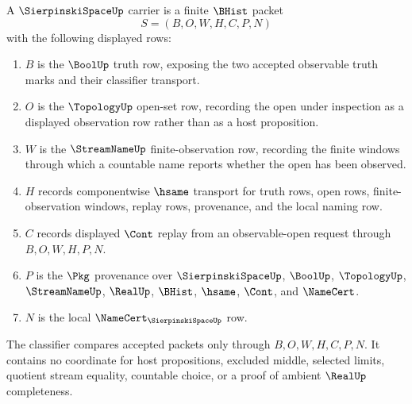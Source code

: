 \begin{definition}
\label{def:sierpinski-space-carrier}
A $\SierpinskiSpaceUp$ carrier is a finite $\BHist$ packet
$$
S=(B,O,W,H,C,P,N)
$$
with the following displayed rows:
\begin{enumerate}
\item $B$ is the $\BoolUp$ truth row, exposing the two accepted observable truth marks and their classifier transport.
\item $O$ is the $\TopologyUp$ open-set row, recording the open under inspection as a displayed observation row rather than as a host proposition.
\item $W$ is the $\StreamNameUp$ finite-observation row, recording the finite windows through which a countable name reports whether the open has been observed.
\item $H$ records componentwise $\hsame$ transport for truth rows, open rows, finite-observation windows, replay rows, provenance, and the local naming row.
\item $C$ records displayed $\Cont$ replay from an observable-open request through $B,O,W,H,P,N$.
\item $P$ is the $\Pkg$ provenance over $\SierpinskiSpaceUp$, $\BoolUp$, $\TopologyUp$, $\StreamNameUp$, $\RealUp$, $\BHist$, $\hsame$, $\Cont$, and $\NameCert$.
\item $N$ is the local $\NameCert_{\SierpinskiSpaceUp}$ row.
\end{enumerate}
The classifier compares accepted packets only through $B,O,W,H,C,P,N$. It contains no coordinate for host propositions, excluded middle, selected limits, quotient stream equality, countable choice, or a proof of ambient $\RealUp$ completeness.
\end{definition}

